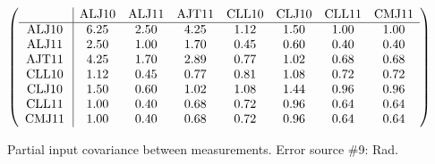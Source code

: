 \begin{table}[H]
\scriptsize
\begin{center}
\renewcommand{\arraystretch}{1.1}
\begin{math}\left(\begin{array}{c|ccccccc}
 & \mathrm{ALJ10} & 
\mathrm{ALJ11} & 
\mathrm{AJT11} & 
\mathrm{CLL10} & 
\mathrm{CLJ10} & 
\mathrm{CLL11} & 
\mathrm{CMJ11} \\
\hline
\mathrm{ALJ10} \hspace*{2pt} &       6.25 &       2.50 &       4.25 &       1.12 &       1.50 &       1.00 &       1.00 \\
\mathrm{ALJ11} \hspace*{2pt} &       2.50 &       1.00 &       1.70 &       0.45 &       0.60 &       0.40 &       0.40 \\
\mathrm{AJT11} \hspace*{2pt} &       4.25 &       1.70 &       2.89 &       0.77 &       1.02 &       0.68 &       0.68 \\
\mathrm{CLL10} \hspace*{2pt} &       1.12 &       0.45 &       0.77 &       0.81 &       1.08 &       0.72 &       0.72 \\
\mathrm{CLJ10} \hspace*{2pt} &       1.50 &       0.60 &       1.02 &       1.08 &       1.44 &       0.96 &       0.96 \\
\mathrm{CLL11} \hspace*{2pt} &       1.00 &       0.40 &       0.68 &       0.72 &       0.96 &       0.64 &       0.64 \\
\mathrm{CMJ11} \hspace*{2pt} &       1.00 &       0.40 &       0.68 &       0.72 &       0.96 &       0.64 &       0.64 \\
\end{array}\right)\end{math}
\caption{Partial input covariance between measurements. Error source \#9: Rad.}
\renewcommand{\arraystretch}{1}
\end{center}
\end{table}
